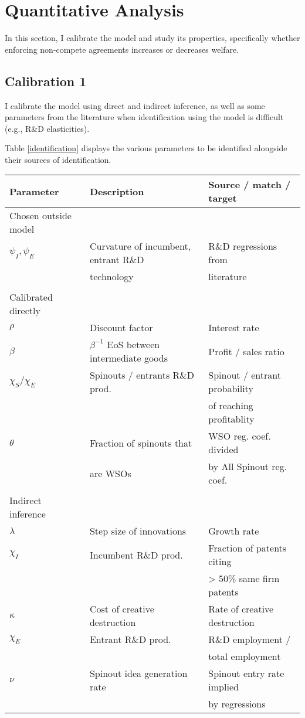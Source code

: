 \documentclass[12pt,english]{article}
\theoremstyle{remark}
\begin{document}
\section{Quantitative Analysis}

In this section, I calibrate the model and study its properties, specifically whether enforcing non-compete agreements increases or decreases welfare. 

\subsection{Calibration 1}

I calibrate the model using direct and indirect inference, as well as some parameters from the literature when identification using the model is difficult (e.g., R\&D elasticities). 

Table \ref{identification} displays the various parameters to be identified alongside their sources of identification. 

\begin{center}
	\footnotesize
	\begin{tabular}{lll}
		\hline 
		Parameter &  Description & Source / match / target \\
		\hline 
		Chosen outside model & \\
		$\psi_I, \psi_E$ & Curvature of incumbent, entrant R\&D & R\&D regressions from \\
		& technology & literature\\
		& & \\
		Calibrated directly &  \\
		$\rho$ & Discount factor & Interest rate \\
		$\beta$ & $\beta^{-1}$ EoS between intermediate goods & Profit / sales ratio \\
		$\chi_S / \chi_E$ & Spinouts / entrants R\&D prod. & Spinout / entrant probability \\
		& & of reaching profitablity \\
		$\theta$ & Fraction of spinouts that & WSO reg. coef. divided \\
		& are WSOs & by All Spinout reg. coef. \\
		& \\
		Indirect inference & \\
		$\lambda$ & Step size of innovations & Growth rate \\
		$\chi_I$ & Incumbent R\&D prod. & Fraction of patents citing \\
		& & > 50\% same firm patents \\
		$\kappa$ & Cost of creative destruction & Rate of creative destruction \\
		$\chi_E$ & Entrant R\&D prod. & R\&D employment / \\
		& & total employment \\
		$\nu$ & Spinout idea generation rate & Spinout entry rate implied \\
		& & by regressions \\
		\hline
	\end{tabular}
	\label{identification}
\end{center}
\end{document}
